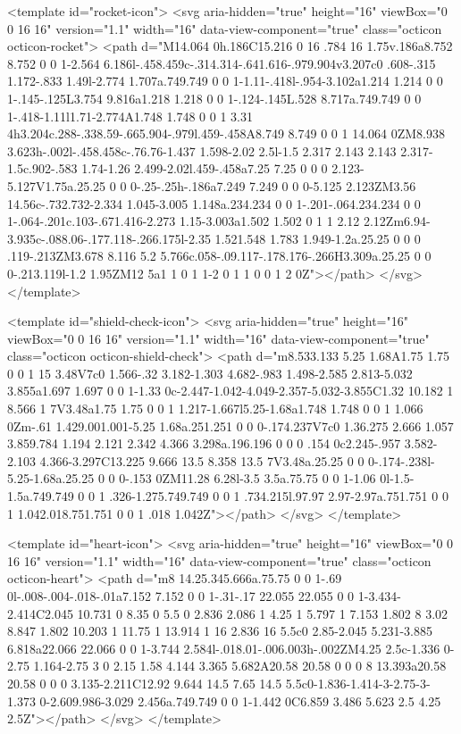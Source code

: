 <template id="rocket-icon">
  <svg aria-hidden="true" height="16" viewBox="0 0 16 16" version="1.1" width="16" data-view-component="true" class="octicon octicon-rocket">
    <path d="M14.064 0h.186C15.216 0 16 .784 16 1.75v.186a8.752 8.752 0 0 1-2.564 6.186l-.458.459c-.314.314-.641.616-.979.904v3.207c0 .608-.315 1.172-.833 1.49l-2.774 1.707a.749.749 0 0 1-1.11-.418l-.954-3.102a1.214 1.214 0 0 1-.145-.125L3.754 9.816a1.218 1.218 0 0 1-.124-.145L.528 8.717a.749.749 0 0 1-.418-1.11l1.71-2.774A1.748 1.748 0 0 1 3.31 4h3.204c.288-.338.59-.665.904-.979l.459-.458A8.749 8.749 0 0 1 14.064 0ZM8.938 3.623h-.002l-.458.458c-.76.76-1.437 1.598-2.02 2.5l-1.5 2.317 2.143 2.143 2.317-1.5c.902-.583 1.74-1.26 2.499-2.02l.459-.458a7.25 7.25 0 0 0 2.123-5.127V1.75a.25.25 0 0 0-.25-.25h-.186a7.249 7.249 0 0 0-5.125 2.123ZM3.56 14.56c-.732.732-2.334 1.045-3.005 1.148a.234.234 0 0 1-.201-.064.234.234 0 0 1-.064-.201c.103-.671.416-2.273 1.15-3.003a1.502 1.502 0 1 1 2.12 2.12Zm6.94-3.935c-.088.06-.177.118-.266.175l-2.35 1.521.548 1.783 1.949-1.2a.25.25 0 0 0 .119-.213ZM3.678 8.116 5.2 5.766c.058-.09.117-.178.176-.266H3.309a.25.25 0 0 0-.213.119l-1.2 1.95ZM12 5a1 1 0 1 1-2 0 1 1 0 0 1 2 0Z"></path>
</svg>
</template>

<template id="shield-check-icon">
  <svg aria-hidden="true" height="16" viewBox="0 0 16 16" version="1.1" width="16" data-view-component="true" class="octicon octicon-shield-check">
    <path d="m8.533.133 5.25 1.68A1.75 1.75 0 0 1 15 3.48V7c0 1.566-.32 3.182-1.303 4.682-.983 1.498-2.585 2.813-5.032 3.855a1.697 1.697 0 0 1-1.33 0c-2.447-1.042-4.049-2.357-5.032-3.855C1.32 10.182 1 8.566 1 7V3.48a1.75 1.75 0 0 1 1.217-1.667l5.25-1.68a1.748 1.748 0 0 1 1.066 0Zm-.61 1.429.001.001-5.25 1.68a.251.251 0 0 0-.174.237V7c0 1.36.275 2.666 1.057 3.859.784 1.194 2.121 2.342 4.366 3.298a.196.196 0 0 0 .154 0c2.245-.957 3.582-2.103 4.366-3.297C13.225 9.666 13.5 8.358 13.5 7V3.48a.25.25 0 0 0-.174-.238l-5.25-1.68a.25.25 0 0 0-.153 0ZM11.28 6.28l-3.5 3.5a.75.75 0 0 1-1.06 0l-1.5-1.5a.749.749 0 0 1 .326-1.275.749.749 0 0 1 .734.215l.97.97 2.97-2.97a.751.751 0 0 1 1.042.018.751.751 0 0 1 .018 1.042Z"></path>
</svg>
</template>

<template id="heart-icon">
  <svg aria-hidden="true" height="16" viewBox="0 0 16 16" version="1.1" width="16" data-view-component="true" class="octicon octicon-heart">
    <path d="m8 14.25.345.666a.75.75 0 0 1-.69 0l-.008-.004-.018-.01a7.152 7.152 0 0 1-.31-.17 22.055 22.055 0 0 1-3.434-2.414C2.045 10.731 0 8.35 0 5.5 0 2.836 2.086 1 4.25 1 5.797 1 7.153 1.802 8 3.02 8.847 1.802 10.203 1 11.75 1 13.914 1 16 2.836 16 5.5c0 2.85-2.045 5.231-3.885 6.818a22.066 22.066 0 0 1-3.744 2.584l-.018.01-.006.003h-.002ZM4.25 2.5c-1.336 0-2.75 1.164-2.75 3 0 2.15 1.58 4.144 3.365 5.682A20.58 20.58 0 0 0 8 13.393a20.58 20.58 0 0 0 3.135-2.211C12.92 9.644 14.5 7.65 14.5 5.5c0-1.836-1.414-3-2.75-3-1.373 0-2.609.986-3.029 2.456a.749.749 0 0 1-1.442 0C6.859 3.486 5.623 2.5 4.25 2.5Z"></path>
</svg>
</template>

